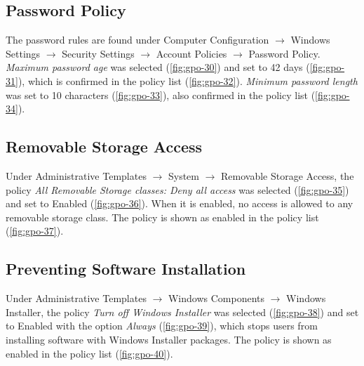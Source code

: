 
\subsection{Password Policy}
\label{sec:gpo-password}
The password rules are found under Computer Configuration $\rightarrow$ Windows Settings $\rightarrow$ Security Settings $\rightarrow$ Account Policies $\rightarrow$ Password Policy. \emph{Maximum password age} was selected (\autoref{fig:gpo-30}) and set to 42 days (\autoref{fig:gpo-31}), which is confirmed in the policy list (\autoref{fig:gpo-32}). \emph{Minimum password length} was set to 10 characters (\autoref{fig:gpo-33}), also confirmed in the policy list (\autoref{fig:gpo-34}).


\subsection{Removable Storage Access}
\label{sec:gpo-removable}
Under Administrative Templates $\rightarrow$ System $\rightarrow$ Removable Storage Access, the policy \emph{All Removable Storage classes: Deny all access} was selected (\autoref{fig:gpo-35}) and set to Enabled (\autoref{fig:gpo-36}). When it is enabled, no access is allowed to any removable storage class. The policy is shown as enabled in the policy list (\autoref{fig:gpo-37}).


\subsection{Preventing Software Installation}
\label{sec:gpo-installer}
Under Administrative Templates $\rightarrow$ Windows Components $\rightarrow$ Windows Installer, the policy \emph{Turn off Windows Installer} was selected (\autoref{fig:gpo-38}) and set to Enabled with the option \emph{Always} (\autoref{fig:gpo-39}), which stops users from installing software with Windows Installer packages. The policy is shown as enabled in the policy list (\autoref{fig:gpo-40}).

